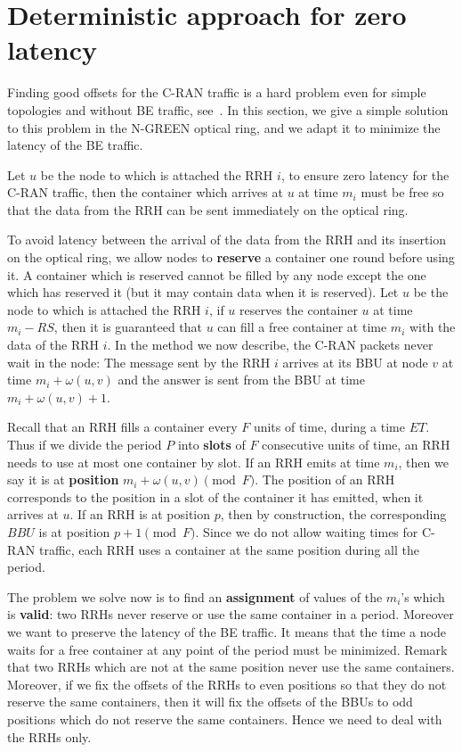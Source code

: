 \documentclass[10pt, conference, letterpaper]{IEEEtran}
\begin{document}
\section{Deterministic approach for zero latency} \label{sec:deterministicalgorithms}

Finding good offsets for the C-RAN traffic is a hard problem even for simple topologies and without BE traffic, see~\cite{dominique2018deterministic}. In this section, we give a simple solution to this problem in the N-GREEN optical ring, and we adapt it to minimize the latency of the BE traffic.

Let $u$ be the node to which is attached the RRH $i$, to ensure zero latency for the C-RAN traffic, then the container which arrives at $u$ at time $m_i$ must be free so that the data from the RRH can be sent immediately on the optical ring. 

To avoid latency between the arrival of the data from the RRH and its insertion on the optical ring, 
we allow nodes to \textbf{reserve} a container one round before using it. A container which is reserved cannot be filled by any node except the one which has reserved it (but it may contain data when it is reserved). 
Let $u$ be the node to which is attached the RRH $i$, if $u$ reserves the container $u$ at time $m_i - RS$, then it is guaranteed that $u$ can fill a free container at time $m_i$ with the data of the RRH $i$.
In the method we now describe, the C-RAN packets never wait in the node: The message sent by the RRH $i$ arrives at its BBU at node $v$ at time $m_i + \omega(u,v)$ and the answer is sent from the BBU at time $m_i + \omega(u,v) +1$.

Recall that an RRH fills a container every $F$ units of time, during a time $ET$. 
Thus if we divide the period $P$ into \textbf{slots} of $F$ consecutive units of time, an RRH needs to use at most one container by slot. If an RRH emits at time $m_i$, then we say it is at \textbf{position} $m_i + \omega(u,v)\pmod F$. 
The position of an RRH corresponds to the position in a slot of the container it has emitted, when it arrives at $u$. 
If an RRH is at position $p$, then by construction, the corresponding $BBU$ is at position $p+1\pmod F$. Since we do not allow waiting times for C-RAN traffic, each RRH uses a container at the same position during all the period. 

The problem we solve now is to find an \textbf{assignment} of values of the $m_i$'s which is \textbf{valid}: two RRHs never reserve or use the same container in a period. Moreover we want to preserve the latency of the BE traffic. It means that the time a node waits for a free container at any point of the period must be minimized. 
Remark that two RRHs which are not at the same position never use the same containers. Moreover, if we fix the offsets of the RRHs to even positions so that they do not reserve the same containers, then it will fix the offsets of the BBUs to odd positions which do not reserve the same containers. Hence we need to deal with the RRHs only.
\end{document}
